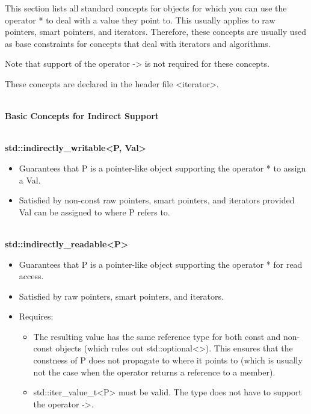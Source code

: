 
This section lists all standard concepts for objects for which you can use the operator * to deal with a value they point to. This usually applies to raw pointers, smart pointers, and iterators. Therefore, these concepts are usually used as base constraints for concepts that deal with iterators and algorithms.

Note that support of the operator -> is not required for these concepts.

These concepts are declared in the header file <iterator>.


\noindent
\hspace*{\fill} \\ %
\textbf{Basic Concepts for Indirect Support}

\noindent
\hspace*{\fill} \\ %
\textbf{std::indirectly\_writable<P, Val>}

\begin{itemize}
\item
Guarantees that P is a pointer-like object supporting the operator * to assign a Val.
	
\item
Satisfied by non-const raw pointers, smart pointers, and iterators provided Val can be assigned to where P refers to.
\end{itemize}


\noindent
\hspace*{\fill} \\ %
\textbf{std::indirectly\_readable<P>}

\begin{itemize}
\item
Guarantees that P is a pointer-like object supporting the operator * for read access.

\item
Satisfied by raw pointers, smart pointers, and iterators.


\item
Requires:
\begin{itemize}
\item
The resulting value has the same reference type for both const and non-const objects (which rules out std::optional<>). This ensures that the constness of P does not propagate to where it points to (which is usually not the case when the operator returns a reference to a member).

\item
std::iter\_value\_t<P> must be valid. The type does not have to support the operator ->.
\end{itemize}
\end{itemize}

